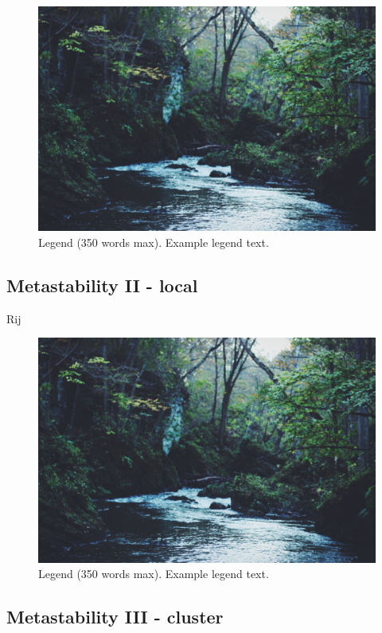 \documentclass[fleqn,10pt]{wlscirep}
\begin{document}
\begin{figure}[ht]
\centering
\includegraphics[width=\linewidth]{stream}
\caption{Legend (350 words max). Example legend text.}
\label{fig:stream}
\end{figure}


\subsection*{Metastability  II - local }
Rij

\begin{figure}[ht]
\centering
\includegraphics[width=\linewidth]{stream}
\caption{Legend (350 words max). Example legend text.}
\label{fig:stream}
\end{figure}


\subsection*{Metastability III - cluster }
\end{document}
